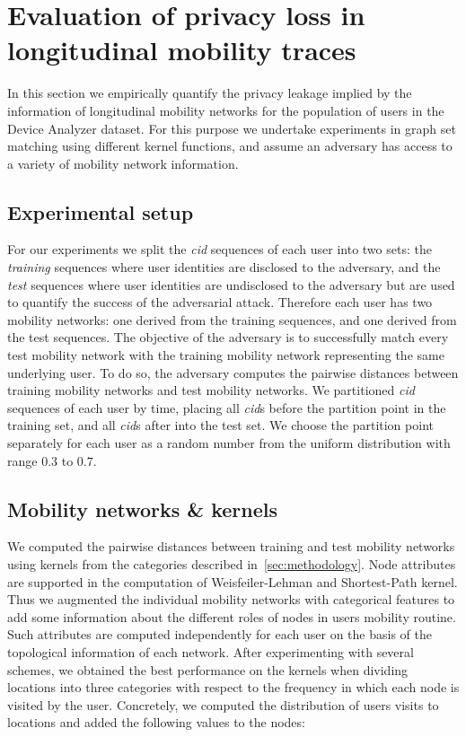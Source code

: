 \section{Evaluation of privacy loss in longitudinal mobility traces}

In this section we empirically quantify the privacy leakage implied by the information of longitudinal mobility networks for the population of users in the Device Analyzer dataset.
For this purpose we undertake experiments in graph set matching using different kernel functions, and assume an adversary has access to a variety of mobility network information.

\subsection{Experimental setup}

For our experiments we split the \emph{cid} sequences of each user into two sets: the \emph{training} sequences where user identities are disclosed to the adversary, and the \emph{test} sequences where user identities are undisclosed to the adversary but are used to quantify the success of the adversarial attack.
Therefore each user has two mobility networks: one derived from the training sequences, and one derived from the test sequences.
The objective of the adversary is to successfully match every test mobility network with the training mobility network representing the same underlying user.
To do so, the adversary computes the pairwise distances between training mobility networks and test mobility networks.
We partitioned \emph{cid} sequences of each user by time, placing all \emph{cid}s before the partition point in the training set, and all \emph{cid}s after into the test set.
We choose the partition point separately for each user as a random number from the uniform distribution with range $ 0.3 $ to $ 0.7 $.

\subsection{Mobility networks \& kernels}

We computed the pairwise distances between training and test mobility networks using kernels from the categories described in~\cref{sec:methodology}.
Node attributes are supported in the computation of Weisfeiler-Lehman and Shortest-Path kernel.
Thus we augmented the individual mobility networks with categorical features to add some information about the different roles of nodes in users mobility routine.
Such attributes are computed independently for each user on the basis of the topological information of each network.
After experimenting with several schemes, we obtained the best performance on the kernels when dividing locations into three categories with respect to the frequency in which each node is visited by the user.
Concretely, we computed the distribution of users visits to locations and added the following values to the nodes:


